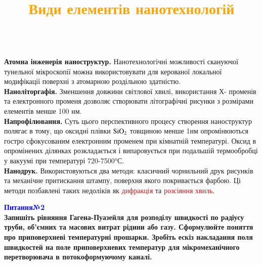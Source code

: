 \documentclass[aspectratio=169]{beamer}
\begin{document}
{
\title{\textcolor{orange}{Види елементів нанотехнологій}}

\begin{frame}
\textcolor{black}{}\\
\textbf{Атомна інженерія наноструктур.} Нанотехнологічні можливості скануючої
тунельної мікроскопії можна використовувати для керованої локальної модифікації поверхні з атомарною роздільною здатністю.\\
\textbf{Наноліторгафія.} Зменшення довжини світлової хвилі, використання Х- променів та електронного променя дозволяє створювати літографічні рисунки з розмірами елементів менше 100 нм.\\
\textbf{Напрофілювання.} Суть цього перспективного процесу створення
наноструктур полягає в тому, що оксидні плівки $\rm SiO_2$ товщиною менше 1нм
опромінюються гостро сфокусованим електронним променем при кімнатній
температурі. Оксид в опромінених ділянках розкладається і випаровується при
подальшій термообробці у вакуумі при температурі 720-7500°С.\\
\textbf{Нанодрук.} Використовуються два методи: класичний чорнильний друк
рисунків та механічне притискання штампу, поверхня якого покривається фарбою. Ці методи позбавлені таких недоліків як \textcolor{red}{дифракція} та \textcolor{red}{розсіяння хвиль}.
\end{frame}
}



{

\begin{frame}
\large\textcolor{blue}{\textbf {Питання№2}}\\
\textbf {Запишіть рівняння Гагена-Пуазейля для розподілу швидкості по радіусу труби, об’ємних та масових витрат рідини або газу. Сформулюйте поняття про приповерхневі температурні прошарки. Зробіть ескіз накладання поля швидкостей на поле приповерхневих температур для мікромеханічного перетворювача в потокоформуючому каналі.}
\end{frame}
}
\end{document}
